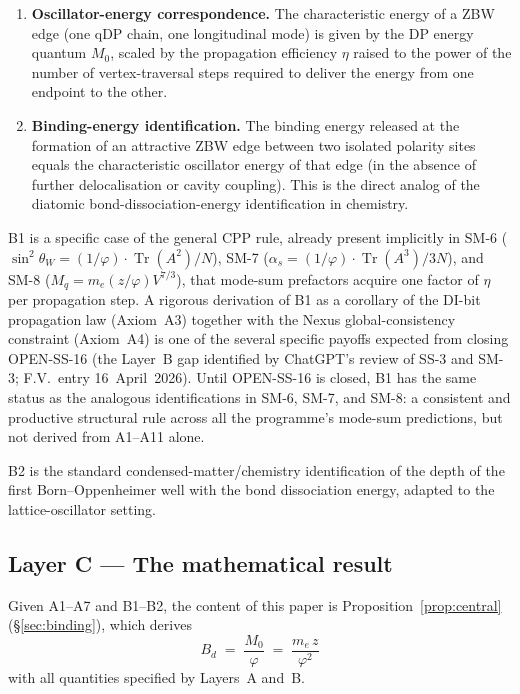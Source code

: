 \documentclass[11pt,letterpaper]{article}
\newcommand{\phig}{\varphi}
\newcommand{\Tr}{\operatorname{Tr}}
\newcommand{\Mzero}{M_0}
\newcommand{\Bd}{B_{d}}
\begin{document}
\begin{enumerate}[label=(B\arabic*)]
\item \textbf{Oscillator-energy correspondence.} The characteristic energy of a ZBW edge (one qDP chain, one longitudinal mode) is given by the DP energy quantum $\Mzero$, scaled by the propagation efficiency $\eta$ raised to the power of the number of vertex-traversal steps required to deliver the energy from one endpoint to the other.
\item \textbf{Binding-energy identification.} The binding energy released at the formation of an attractive ZBW edge between two isolated polarity sites equals the characteristic oscillator energy of that edge (in the absence of further delocalisation or cavity coupling). This is the direct analog of the diatomic bond-dissociation-energy identification in chemistry.
\end{enumerate}

B1 is a specific case of the general CPP rule, already present implicitly in SM-6 ($\sin^2\theta_W = (1/\phig)\cdot\Tr(A^2)/N$), SM-7 ($\alpha_s = (1/\phig)\cdot\Tr(A^3)/3N$), and SM-8 ($M_q = m_e(z/\phig)V^{7/3}$), that mode-sum prefactors acquire one factor of $\eta$ per propagation step. A rigorous derivation of B1 as a corollary of the DI-bit propagation law (Axiom~A3) together with the Nexus global-consistency constraint (Axiom~A4) is one of the several specific payoffs expected from closing OPEN-SS-16 (the Layer~B gap identified by ChatGPT's review of SS-3 and SM-3; F.V.\ entry 16~April~2026). Until OPEN-SS-16 is closed, B1 has the same status as the analogous identifications in SM-6, SM-7, and SM-8: a consistent and productive structural rule across all the programme's mode-sum predictions, but not derived from A1--A11 alone.

B2 is the standard condensed-matter/chemistry identification of the depth of the first Born--Oppenheimer well with the bond dissociation energy, adapted to the lattice-oscillator setting.

\subsection{Layer C --- The mathematical result}
\label{sec:layerC}

Given A1--A7 and B1--B2, the content of this paper is Proposition~\ref{prop:central} (\S\ref{sec:binding}), which derives
\[
\Bd \;=\; \frac{\Mzero}{\phig} \;=\; \frac{m_e\, z}{\phig^{2}}
\]
with all quantities specified by Layers~A and~B.
\end{document}
